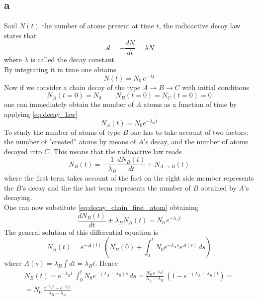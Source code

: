 \subsection*{a}
Said $N(t)$ the number of atoms present at time $t$, the radioactive decay law states that
\begin{equation}
    \mathcal{A} = -\frac{dN}{dt} = \lambda N
    \label{eq:decay_law}
\end{equation}
where $\lambda$ is called the decay constant. \\
By integrating it in time one obtains 
\begin{equation}
    N(t) = N_0 \, e^{-\lambda t}
    \label{eq:decay_chain_first_atom}
\end{equation}
Now if we consider a chain decay of the type $A \rightarrow B \rightarrow C$ with initial conditions 
\begin{equation*}
    N_A(t=0) = N_0 \qquad N_B(t=0) = N_C(t=0) = 0
\end{equation*}
one can immediately obtain the number of $A$ atoms as a function of time by applying \ref{eq:decay_law}
\begin{equation*}
    N_A(t) = N_0 e^{-\lambda_A t}
\end{equation*}
To study the number of atoms of type $B$ one has to take account of two factors: the number of "created" atoms by means of $A$'s decay, and
the number of atoms decayed into $C$. This means that the radioactive law reads 
\begin{equation*}
    N_B(t) = -\frac{1}{\lambda_B}\frac{dN_B(t)}{dt} + N_{A \to B}(t)
\end{equation*}
where the first term takes account of the fact on the right side member represents the $B$'s decay and the the last term 
represents the number of $B$ obtained by $A$'s decaying. \\
One can now substitute \ref{eq:decay_chain_first_atom} obtaining 
\begin{equation*}
    \frac{dN_B(t)}{dt} + \lambda_B N_B(t) =  N_0 \, e^{-\lambda_A t}
\end{equation*}
The general solution of this differential equation is 
\begin{equation*}
    N_B(t) = e^{-A(t)} \ \left(N_B(0) + \int_0^t N_0 e^{-\lambda_A s} e^{A(s)} \, ds \right)
\end{equation*}
where $A(s) = \lambda_B \int dt = \lambda_B t$. Hence
\begin{gather*}
N_B(t) = e^{-\lambda_B t} \ \int_0^t N_0 e^{-(\lambda_A - \lambda_B) s} \, ds 
= \frac{N_0 \, e^{-\lambda_B t}}{\lambda_A - \lambda_B} \ \left(1 - e^{-(\lambda_A - \lambda_B) t}\right) = \\
= N_0 \, \frac{e^{-\lambda_A t} - e^{-\lambda_B t}}{\lambda_B - \lambda_A}
\end{gather*}

